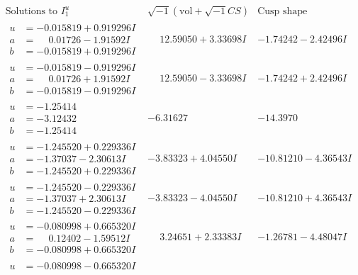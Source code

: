 \documentclass[1p]{elsarticle_modified}
\theoremstyle{definition}
\newcommand{\I}{\sqrt{-1}}
\begin{document}
$$\begin{array}{c|c|c}  
\text{Solutions to }I^u_{1}& \I (\text{vol} + \sqrt{-1}CS) & \text{Cusp shape}\\
 \hline 
\begin{aligned}
u &= -0.015819 + 0.919296 I \\
a &= \phantom{-}0.01726 - 1.91592 I \\
b &= -0.015819 + 0.919296 I\end{aligned}
 & \phantom{-}12.59050 + 3.33698 I & -1.74242 - 2.42496 I \\ \hline\begin{aligned}
u &= -0.015819 - 0.919296 I \\
a &= \phantom{-}0.01726 + 1.91592 I \\
b &= -0.015819 - 0.919296 I\end{aligned}
 & \phantom{-}12.59050 - 3.33698 I & -1.74242 + 2.42496 I \\ \hline\begin{aligned}
u &= -1.25414\phantom{ +0.000000I} \\
a &= -3.12432\phantom{ +0.000000I} \\
b &= -1.25414\phantom{ +0.000000I}\end{aligned}
 & -6.31627\phantom{ +0.000000I} & -14.3970\phantom{ +0.000000I} \\ \hline\begin{aligned}
u &= -1.245520 + 0.229336 I \\
a &= -1.37037 - 2.30613 I \\
b &= -1.245520 + 0.229336 I\end{aligned}
 & -3.83323 + 4.04550 I & -10.81210 - 4.36543 I \\ \hline\begin{aligned}
u &= -1.245520 - 0.229336 I \\
a &= -1.37037 + 2.30613 I \\
b &= -1.245520 - 0.229336 I\end{aligned}
 & -3.83323 - 4.04550 I & -10.81210 + 4.36543 I \\ \hline\begin{aligned}
u &= -0.080998 + 0.665320 I \\
a &= \phantom{-}0.12402 - 1.59512 I \\
b &= -0.080998 + 0.665320 I\end{aligned}
 & \phantom{-}3.24651 + 2.33383 I & -1.26781 - 4.48047 I \\ \hline\begin{aligned}
u &= -0.080998 - 0.665320 I \\

\end{aligned}
\end{array}$$
\end{document}
